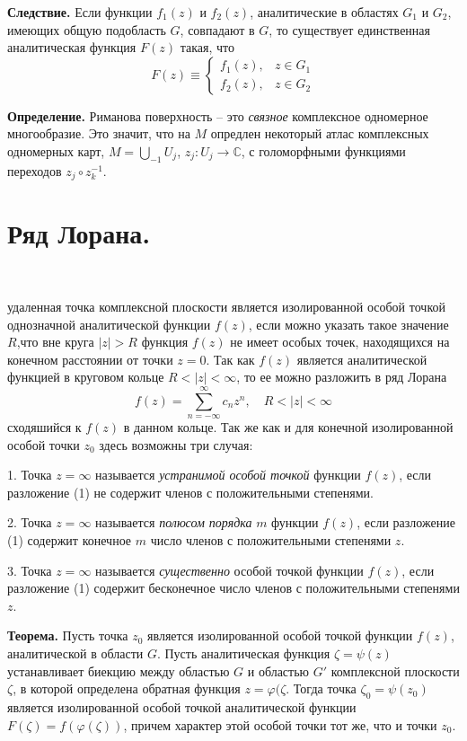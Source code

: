\documentclass[9pt]{article}
\begin{document}
\par\textbf{Следствие.} Если функции \(f_1(z)\) и \(f_2(z)\), аналитические в областях \(G_1\) и \(G_2\), имеющих общую подобласть \(G\), совпадают в \(G\), то существует единственная аналитическая функция \(F(z)\) такая, что
\[F(z)\equiv\left\{\begin{array}{ll}
    f_1(z), & z\in G_1 \\
    f_2(z), & z\in G_2
\end{array}\right.\]
\par\textbf{Определение.} Риманова поверхность -- это \textit{связное} комплексное одномерное многообразие. Это значит, что на \(M\) опредлен некоторый атлас комплексных одномерных карт, \(M=\bigcup_{-1}U_j\), \(z_j:U_j\to\mathbb C\), с голоморфными функциями переходов \(z_j\circ z_k^{-1}\).

\section{Ряд Лорана.}

\ 
\par

 удаленная точка комплексной плоскости является изолированной особой точкой однозначной аналитической функции \(f(z)\), если можно указать такое значение \(R\),что вне круга \(|z|>R\) функция \(f(z)\) не имеет особых точек, находящихся на конечном расстоянии от точки \(z=0\). Так как \(f(z)\) является аналитической функцией в круговом кольце \(R<|z|<\infty\), то ее можно разложить в ряд Лорана
\begin{equation}
    f(z)=\displaystyle\sum_{n=-\infty}^\infty c_nz^n,\quad R<|z|<\infty
\end{equation}
сходяшийся к \(f(z)\) в данном кольце. Так же как и для конечной изолированной особой точки \(z_0\) здесь возможны три случая:
\par1. Точка \(z=\infty\) называется \textit{устранимой особой точкой} функции \(f(z)\), если разложение (1) не содержит членов с положительными степенями.
\par2. Точка \(z=\infty\) называется \textit{полюсом порядка} \(m\) функции \(f(z)\), если разложение (1) содержит конечное \(m\) число членов с положительными степенями \(z\).
\par3. Точка \(z=\infty\) называется \textit{существенно} особой точкой функции \(f(z)\), если разложение (1) содержит бесконечное число членов с положительными степенями \(z\).
\par\textbf{Теорема.} Пусть точка \(z_0\) является изолированной особой точкой функции \(f(z)\), аналитической в области \(G\). Пусть аналитическая функция \(\zeta = \psi(z)\) устанавливает биекцию между областью \(G\) и областью \(G'\) комплексной плоскости \(\zeta\), в которой определена обратная функция \(z=\varphi(\zeta\). Тогда точка \(\zeta_0=\psi(z_0)\) является изолированной особой точкой аналитической функции \(F(\zeta)=f(\varphi(\zeta))\), причем характер этой особой точки тот же, что и точки \(z_0\).
\end{document}
